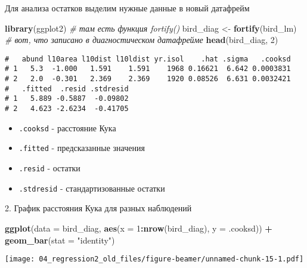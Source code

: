 \documentclass[
  ignorenonframetext,
  t,xcolor=table]{beamer}
\newenvironment{Shaded}{\begin{snugshade}}{\end{snugshade}}
\newcommand{\AttributeTok}[1]{\textcolor[rgb]{0.13,0.29,0.53}{#1}}
\newcommand{\CommentTok}[1]{\textcolor[rgb]{0.56,0.35,0.01}{\textit{#1}}}
\newcommand{\DecValTok}[1]{\textcolor[rgb]{0.00,0.00,0.81}{#1}}
\newcommand{\FunctionTok}[1]{\textcolor[rgb]{0.13,0.29,0.53}{\textbf{#1}}}
\newcommand{\NormalTok}[1]{#1}
\newcommand{\OtherTok}[1]{\textcolor[rgb]{0.56,0.35,0.01}{#1}}
\newcommand{\SpecialCharTok}[1]{\textcolor[rgb]{0.81,0.36,0.00}{\textbf{#1}}}
\newcommand{\StringTok}[1]{\textcolor[rgb]{0.31,0.60,0.02}{#1}}
\providecommand{\tightlist}{%
  \setlength{\itemsep}{0pt}\setlength{\parskip}{0pt}}
\begin{document}
\begin{frame}[fragile]{Для анализа остатков выделим нужные данные в
новый датафрейм}
\protect\hypertarget{ux434ux43bux44f-ux430ux43dux430ux43bux438ux437ux430-ux43eux441ux442ux430ux442ux43aux43eux432-ux432ux44bux434ux435ux43bux438ux43c-ux43dux443ux436ux43dux44bux435-ux434ux430ux43dux43dux44bux435-ux432-ux43dux43eux432ux44bux439-ux434ux430ux442ux430ux444ux440ux435ux439ux43c}{}
\begin{Shaded}
\begin{Highlighting}[]
\FunctionTok{library}\NormalTok{(ggplot2) }\CommentTok{\# там есть функция fortify()}
\NormalTok{bird\_diag }\OtherTok{\textless{}{-}} \FunctionTok{fortify}\NormalTok{(bird\_lm)}
\CommentTok{\# вот, что записано в диагностическом датафрейме}
\FunctionTok{head}\NormalTok{(bird\_diag, }\DecValTok{2}\NormalTok{)}
\end{Highlighting}
\end{Shaded}

\begin{verbatim}
#   abund l10area l10dist l10ldist yr.isol    .hat .sigma   .cooksd
# 1   5.3  -1.000   1.591    1.591    1968 0.16621  6.642 0.0003831
# 2   2.0  -0.301   2.369    2.369    1920 0.08526  6.631 0.0032421
#   .fitted  .resid .stdresid
# 1   5.889 -0.5887  -0.09802
# 2   4.623 -2.6234  -0.41705
\end{verbatim}

\pause

\begin{itemize}
\tightlist
\item
  \texttt{.cooksd} - расстояние Кука\\
\item
  \texttt{.fitted} - предсказанные значения\\
\item
  \texttt{.resid} - остатки\\
\item
  \texttt{.stdresid} - стандартизованные остатки
\end{itemize}
\end{frame}

\begin{frame}[fragile]{2. График расстояния Кука для разных наблюдений}
\protect\hypertarget{ux433ux440ux430ux444ux438ux43a-ux440ux430ux441ux441ux442ux43eux44fux43dux438ux44f-ux43aux443ux43aux430-ux434ux43bux44f-ux440ux430ux437ux43dux44bux445-ux43dux430ux431ux43bux44eux434ux435ux43dux438ux439}{}
\begin{Shaded}
\begin{Highlighting}[]
\FunctionTok{ggplot}\NormalTok{(}\AttributeTok{data =}\NormalTok{ bird\_diag, }\FunctionTok{aes}\NormalTok{(}\AttributeTok{x =} \DecValTok{1}\SpecialCharTok{:}\FunctionTok{nrow}\NormalTok{(bird\_diag), }\AttributeTok{y =}\NormalTok{ .cooksd)) }\SpecialCharTok{+} 
  \FunctionTok{geom\_bar}\NormalTok{(}\AttributeTok{stat =} \StringTok{"identity"}\NormalTok{)}
\end{Highlighting}
\end{Shaded}

\texttt{[image: 04\_regression2\_old\_files/figure-beamer/unnamed-chunk-15-1.pdf]}
\end{frame}
\end{document}
